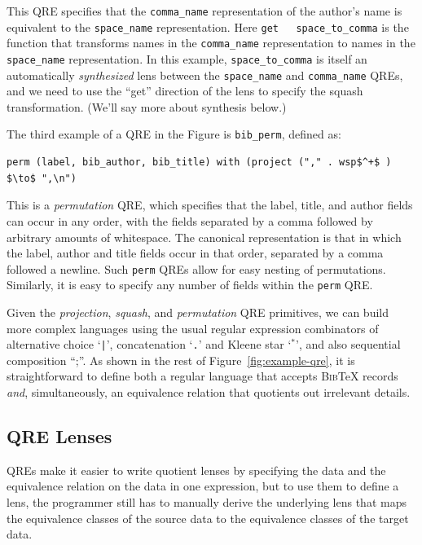 \documentclass{svproc}
\newcommand{\cd}[1]{\lstinline[backgroundcolor=\color{white}]$#1$}
\newcommand{\bibtex}{\textsc{Bib}\TeX{}}
\begin{document}
\noindent This QRE specifies that the \cd{comma_name} representation of the
author's name is equivalent to the \cd{space_name} representation.  Here \cd{get
  space_to_comma} is the function that transforms names in the \cd{comma_name}
representation to names in the \cd{space_name} representation.  In this
  example, \cd{space_to_comma} is itself an automatically \textit{synthesized}
  lens between the \cd{space_name} and \cd{comma_name} QREs, and we need to use
  the ``get'' direction of the lens to specify the squash transformation. (We'll
  say more about synthesis below.)

The third example of a QRE in the Figure is \cd{bib_perm}, defined as:
\begin{center}
\begin{lstlisting}
perm (label, bib_author, bib_title) with (project ("," . wsp$^+$ ) $\to$ ",\n")
\end{lstlisting}
\end{center}

\noindent This is a \textit{permutation} QRE, which specifies that the label, title, and author fields can occur
in any order, with the fields separated by a comma followed by arbitrary amounts
of whitespace. The canonical representation is that in which the label, author
and title fields occur in that order, separated by a comma followed a newline.
Such \cd{perm} QREs allow for easy nesting of permutations. Similarly, it is easy
to specify any number of fields within the \cd{perm} QRE.

Given the \textit{projection}, \textit{squash}, and \textit{permutation}
  QRE primitives, we can build more complex languages using the usual regular
  expression combinators of alternative choice `\cd{|}', concatenation `\cd{.}'
  and Kleene star `$^*$', and also sequential composition ``;''.  As shown in
  the rest of Figure~\ref{fig:example-qre}, it is straightforward to define both a
  regular language that accepts \bibtex{} records \textit{and}, simultaneously,
  an equivalence relation that quotients out irrelevant details.

\subsection{QRE Lenses}
QREs make it easier to write quotient lenses by specifying the data and the
equivalence relation on the data in one expression, but to use them to define a
lens, the programmer still has to manually derive the underlying lens that maps
the equivalence classes of the source data to the equivalence classes of the
target data. 
\end{document}
